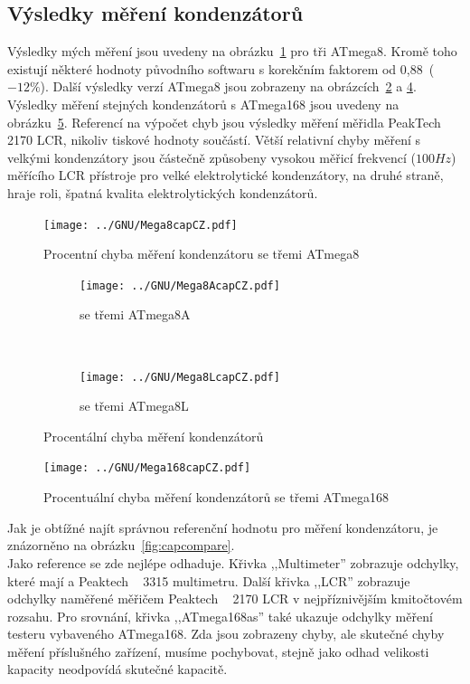 \subsection{Výsledky měření kondenzátorů}
Výsledky mých měření jsou uvedeny na obrázku~\ref{fig:mega8cap} pro tři ATmega8.
Kromě toho existují některé hodnoty původního softwaru s korekčním faktorem
od 0,88~(\(-12\%\)).
Další výsledky verzí ATmega8 jsou zobrazeny na obrázcích~\ref{fig:mega8Acap} a \ref{fig:mega8Lcap}.
Výsledky měření stejných kondenzátorů s ATmega168 jsou uvedeny na obrázku~\ref{fig:mega168cap}.
Referencí na výpočet chyb jsou výsledky měření měřidla PeakTech 2170 LCR, nikoliv tiskové hodnoty součástí.
Větší relativní chyby měření s velkými kondenzátory jsou částečně způsobeny vysokou měřicí
frekvencí (\(100Hz\)) měřícího  LCR přístroje pro velké elektrolytické kondenzátory,
na druhé straně, hraje  roli, špatná kvalita elektrolytických kondenzátorů.

\begin{figure}[H]
\centering
\texttt{[image: ../GNU/Mega8capCZ.pdf]}
\caption{Procentní chyba měření kondenzátoru se třemi ATmega8}
\label{fig:mega8cap}
\end{figure}

\begin{figure}[H]
  \begin{subfigure}[b]{.5\textwidth}
    \centering
    \texttt{[image: ../GNU/Mega8AcapCZ.pdf]}
    \caption{se třemi ATmega8A}
    \label{fig:mega8Acap}
  \end{subfigure}
  ~
  \begin{subfigure}[b]{.5\textwidth}
    \centering
    \texttt{[image: ../GNU/Mega8LcapCZ.pdf]}
    \caption{se třemi ATmega8L}
    \label{fig:mega8Lcap}
  \end{subfigure}
  \caption{Procentální chyba měření kondenzátorů}
\end{figure}

\begin{figure}[H]
\centering
\texttt{[image: ../GNU/Mega168capCZ.pdf]}
\caption{Procentuální chyba měření kondenzátorů se třemi ATmega168}
\label{fig:mega168cap}
\end{figure}

Jak je obtížné najít správnou referenční hodnotu pro měření kondenzátoru,
je znázorněno na obrázku~\ref{fig:capcompare}.\\
Jako reference se zde nejlépe odhaduje. Křivka ,,Multimeter'' zobrazuje odchylky,
které mají a Peaktech ~ 3315 multimetru.
Další křivka ,,LCR'' zobrazuje odchylky naměřené měřičem Peaktech ~ 2170 LCR v nejpříznivějším
kmitočtovém rozsahu.
Pro srovnání, křivka ,,ATmega168as'' také ukazuje odchylky měření testeru vybaveného ATmega168.
Zda jsou zobrazeny chyby, ale skutečné chyby měření příslušného zařízení, musíme pochybovat, stejně jako
odhad velikosti kapacity neodpovídá skutečné kapacitě.

